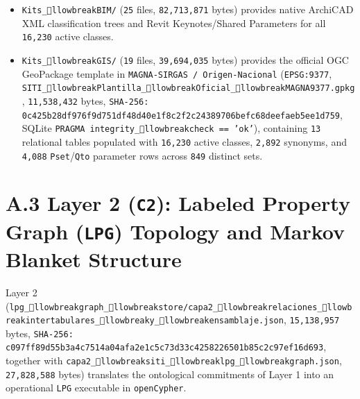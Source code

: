 \documentclass[10pt,a4paper]{article}
\begin{document}
\begin{itemize}
  \item \texttt{Kits\_llowbreak{}BIM/} (\texttt{25} files, \texttt{82,713,871} bytes) provides native ArchiCAD XML classification trees and Revit Keynotes/Shared Parameters for all \texttt{16,230} active classes.
  \item \texttt{Kits\_llowbreak{}GIS/} (\texttt{19} files, \texttt{39,694,035} bytes) provides the official OGC GeoPackage template in \texttt{MAGNA-SIRGAS / Origen-Nacional} (\texttt{EPSG:9377}, \texttt{SITI\_llowbreak{}Plantilla\_llowbreak{}Oficial\_llowbreak{}MAGNA9377.gpkg}, \texttt{11,538,432} bytes, \texttt{SHA-256: 0c425b28df976f9d751df48d40e1f8c2f2c24389706befc68deefaeb5ee1d759}, SQLite \texttt{PRAGMA integrity\_llowbreak{}check == 'ok'}), containing \texttt{13} relational tables populated with \texttt{16,230} active classes, \texttt{2,892} synonyms, and \texttt{4,088} \texttt{Pset}/\texttt{Qto} parameter rows across \texttt{849} distinct sets.
\end{itemize}



\section*{A.3 Layer 2 (\texttt{C2}): Labeled Property Graph (\texttt{LPG}) Topology and Markov Blanket Structure}

Layer 2 (\texttt{lpg\_llowbreak{}graph\_llowbreak{}store/capa2\_llowbreak{}relaciones\_llowbreak{}intertabulares\_llowbreak{}y\_llowbreak{}ensamblaje.json}, \texttt{15,138,957} bytes, \texttt{SHA-256: c097ff89d55b3a4c7514a04afa2e1c5c73d33c4258226501b85c2c97ef16d693}, together with \texttt{capa2\_llowbreak{}siti\_llowbreak{}lpg\_llowbreak{}graph.json}, \texttt{27,828,588} bytes) translates the ontological commitments of Layer 1 into an operational \texttt{LPG} executable in \texttt{openCypher}.
\end{document}
